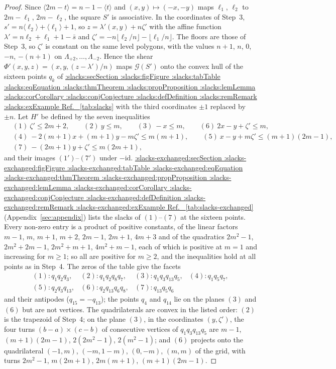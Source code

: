 \documentclass[11pt,a4paper]{article}
\makeatletter
\def\Cref@getprefix#1:#2\relax{#1}
\def\Cref@prefix@sec{sec}
\def\Cref@prefix@fig{fig}
\def\Cref@prefix@tab{tab}
\def\Cref@prefix@eq{eq}
\def\Cref@prefix@thm{thm}
\def\Cref@prefix@prop{prop}
\def\Cref@prefix@lem{lem}
\def\Cref@prefix@cor{cor}
\def\Cref@prefix@conj{conj}
\def\Cref@prefix@def{def}
\def\Cref@prefix@rem{rem}
\def\Cref@prefix@ex{ex}
\def\Cref@type@cap#1{%
  \edef\Cref@tmp{#1}%
  \ifx\Cref@tmp\Cref@prefix@sec Section%
  \else\ifx\Cref@tmp\Cref@prefix@fig Figure%
  \else\ifx\Cref@tmp\Cref@prefix@tab Table%
  \else\ifx\Cref@tmp\Cref@prefix@eq Equation%
  \else\ifx\Cref@tmp\Cref@prefix@thm Theorem%
  \else\ifx\Cref@tmp\Cref@prefix@prop Proposition%
  \else\ifx\Cref@tmp\Cref@prefix@lem Lemma%
  \else\ifx\Cref@tmp\Cref@prefix@cor Corollary%
  \else\ifx\Cref@tmp\Cref@prefix@conj Conjecture%
  \else\ifx\Cref@tmp\Cref@prefix@def Definition%
  \else\ifx\Cref@tmp\Cref@prefix@rem Remark%
  \else\ifx\Cref@tmp\Cref@prefix@ex Example%
  \else Ref.%
  \fi\fi\fi\fi\fi\fi\fi\fi\fi\fi\fi\fi
}
\DeclareRobustCommand{\Cref}[1]{%
  \begingroup
  \edef\Cref@label{#1}%
  \edef\Cref@prefix{\expandafter\Cref@getprefix\Cref@label:\relax}%
  \hyperref[#1]{\Cref@type@cap{\Cref@prefix}~\ref*{#1}}%
  \endgroup
}
\theoremstyle{plain}
\theoremstyle{definition}
\theoremstyle{remark}
\makeatother
\begin{document}
\begin{proof}
Since $\langle 2m-t\rangle=n-1-\langle t\rangle$ and $(x,y)\mapsto(-x,-y)$ maps $\ell_1$, $\ell_2$ to $2m-\ell_1$, $2m-\ell_2$, the square $S'$ is associative.
In the coordinates of Step~3, $s'=n\langle\ell_2\rangle+\langle\ell_1\rangle+1$, so $z=\lambda'(x,y)+n\zeta'$ with the affine function $\lambda'=n\ell_2+\ell_1+1-\bar s$ and $\zeta'=-n\lfloor\ell_2/n\rfloor-\lfloor\ell_1/n\rfloor$.
The floors are those of Step~3, so $\zeta'$ is constant on the same level polygons, with the values $n+1$, $n$, $0$, $-n$, $-(n+1)$ on $\Lambda_{+2},\dots,\Lambda_{-2}$.
Hence the shear $\Phi'(x,y,z)=(x,y,(z-\lambda')/n)$ maps $\mathcal G(S')$ onto the convex hull of the sixteen points $q_k$ of \Cref{tab:slacks} with the third coordinates $\pm1$ replaced by $\pm n$.
Let $H'$ be defined by the seven inequalities
\begin{align*}
&(1)\ \zeta'\le 2m+2,\qquad (2)\ y\le m,\qquad (3)\ -x\le m,\qquad (6)\ 2x-y+\zeta'\le m,\\
&(4)\ -2(m{+}1)x+(m{+}1)y-m\zeta'\le m(m{+}1),\qquad (5)\ x-y+m\zeta'\le(m{+}1)(2m{-}1),\\
&(7)\ -(2m{+}1)y+\zeta'\le m(2m{+}1),
\end{align*}
and their images $(1')$--$(7')$ under $-\mathrm{id}$.
\Cref{tab:slacks-exchanged} (Appendix~\ref{sec:appendix}) lists the slacks of $(1)$--$(7)$ at the sixteen points.
Every non-zero entry is a product of positive constants, of the linear factors $m-1$, $m$, $m+1$, $m+2$, $2m-1$, $2m+1$, $4m+3$ and of the quadratics $2m^2-1$, $2m^2+2m-1$, $2m^2+m+1$, $4m^2+m-1$, each of which is positive at $m=1$ and increasing for $m\ge1$; so all are positive for $m\ge2$, and the inequalities hold at all points as in Step~4.
The zeros of the table give the facets
\[
\begin{array}{llll}
(1)\colon q_1q_2q_3, & (2)\colon q_1q_2q_8q_7, & (3)\colon q_1q_3q_{13}q_5, & (4)\colon q_1q_5q_7,\\
(5)\colon q_2q_3q_{13}, & (6)\colon q_2q_{13}q_6q_8, & (7)\colon q_{13}q_5q_6 &
\end{array}
\]
and their antipodes ($q_{15}=-q_{13}$); the points $q_4$ and $q_{14}$ lie on the planes $(3)$ and $(6)$ but are not vertices.
The quadrilaterals are convex in the listed order: $(2)$ is the trapezoid of Step~4; on the plane $(3)$, in the coordinates $(y,\zeta')$, the four turns $(b-a)\times(c-b)$ of consecutive vertices of $q_1q_3q_{13}q_5$ are $m-1$, $(m+1)(2m-1)$, $2(2m^2-1)$, $2(m^2-1)$; and $(6)$ projects onto the quadrilateral $(-1,m)$, $(-m,1-m)$, $(0,-m)$, $(m,m)$ of the grid, with turns $2m^2-1$, $m(2m+1)$, $2m(m+1)$, $(m+1)(2m-1)$.

\end{proof}
\end{document}
